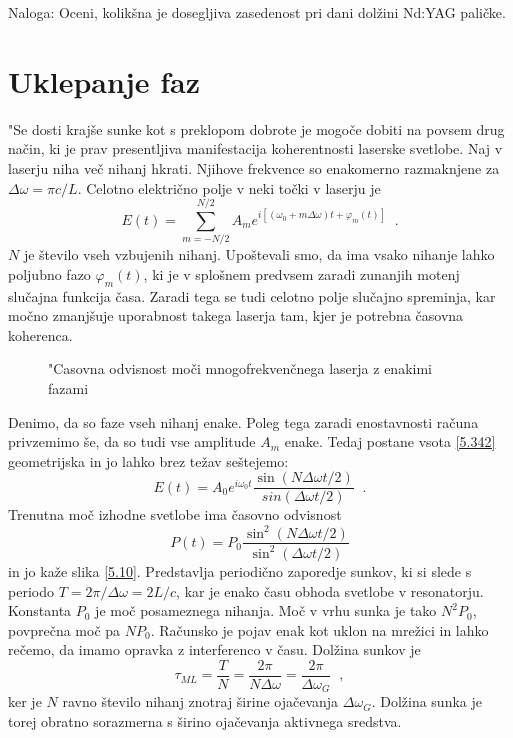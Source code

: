Naloga: Oceni, kolikšna je dosegljiva zasedenost pri dani dolžini Nd:YAG
paličke.

\section{Uklepanje faz}
\label{chap:Uklepanje}
"Se dosti krajše sunke kot s preklopom dobrote je mogoče dobiti na
povsem drug način, ki je prav presentljiva manifestacija koherentnosti
laserske svetlobe. Naj v laserju niha več nihanj hkrati. Njihove frekvence
so enakomerno razmaknjene za $\Delta \omega =\pi c/L$. Celotno električno
polje v neki točki v laserju je 
\begin{equation}
E(t)=\sum_{m=-N/2}^{N/2}A_{m}e^{i[(\omega _{0}+m\Delta \omega )t+\varphi
_{m}(t)]}\;\;.  \label{5.342}
\end{equation}
$N$ je število vseh vzbujenih nihanj. Upoštevali smo, da ima vsako
nihanje lahko poljubno fazo $\varphi _{m}(t)$, ki je v splošnem predvsem
zaradi zunanjih motenj slučajna funkcija časa. Zaradi tega se tudi
celotno polje slučajno spreminja, kar močno zmanjšuje uporabnost
takega laserja tam, kjer je potrebna časovna koherenca.

\begin{figure}[tbp]
\label{s5.10} \vskip 5cm
\caption{"Casovna odvisnost moči mnogofrekvenčnega laserja z enakimi
fazami }
\end{figure}

Denimo, da so faze vseh nihanj enake. Poleg tega zaradi enostavnosti
računa privzemimo še, da so tudi vse amplitude $A_{m}$ enake. Tedaj
postane vsota \ref{5.342} geometrijska in jo lahko brez težav seštejemo: 
\begin{equation}
E(t)=A_{0}e^{i\omega _{0}t}\frac{\sin (N\Delta \omega t/2)}{sin(\Delta
\omega t/2)}\;\;.  \label{5.352}
\end{equation}
Trenutna moč izhodne svetlobe ima časovno odvisnost 
\begin{equation}
P(t)=P_{0}\frac{\sin ^{2}(N\Delta \omega t/2)}{\sin ^{2}(\Delta \omega t/2)}
\label{5.36}
\end{equation}
in jo kaže slika \ref{5.10}. Predstavlja periodično zaporedje sunkov, ki
si slede s periodo $T=2\pi /\Delta \omega =2L/c$, kar je enako času obhoda
svetlobe v resonatorju. Konstanta $P_{0}$ je moč posameznega nihanja.
Moč v vrhu sunka je tako $N^{2}P_{0}$, povprečna moč pa $NP_{0}$.
Računsko je pojav enak kot uklon na mrežici in lahko rečemo, da imamo
opravka z interferenco v času. Dolžina sunkov je 
\begin{equation}
\tau _{ML}=\frac{T}{N}=\frac{2\pi }{N\Delta \omega }=\frac{2\pi }{\Delta
\omega _{G}}\;\;,  \label{5.37}
\end{equation}
ker je $N$ ravno število nihanj znotraj širine ojačevanja $\Delta
\omega _{G}$. Dolžina sunka je torej obratno sorazmerna s širino
ojačevanja aktivnega sredstva.


